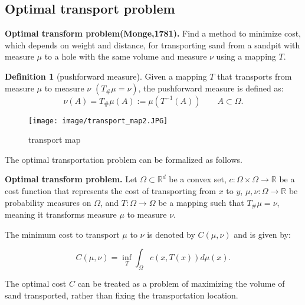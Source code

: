 \documentclass[a4j,10pt, twocolumn, dvipdfmx]{article}
\theoremstyle{definition}
\newtheorem{dfn}{Definition}[section]
\begin{document}
\subsection{Optimal transport problem}
\textbf{Optimal transform problem(Monge,1781).}
Find a method to minimize cost, 
which depends on weight and distance, 
for transporting sand from a sandpit with measure $\mu$ to a hole with the same volume and measure $\nu$ using a mapping $T$.

\begin{dfn}[pushforward measure]
    Given a mapping $T$ that transports from measure $\mu$ to measure $\nu$ $(T_\#\mu = \nu)$, 
    the pushforward measure is defined as:
    \begin{equation*}
        \nu (A) =  T_\#\mu (A) := \mu (T^{-1} (A)) \qquad A \subset \Omega.
    \end{equation*}
\end{dfn}

\begin{figure}[htbp]
    \begin{center}
        \texttt{[image: image/transport\_map2.JPG]}
        \caption{transport map}
    \end{center}
\end{figure}

The optimal transportation problem can be formalized as follows.
\newline

\textbf{Optimal transform problem.}
Let $\Omega \subset \mathbb{R}^d$ be a convex set,
$c: \Omega \times \Omega \to \mathbb{R}$ be a cost function that represents the cost of transporting from $x$ to $y$, 
$\mu, \nu : \Omega \to \mathbb{R}$ be probability measures on $\Omega$, and $T: \Omega \to \Omega$ be a mapping such that $T_\#\mu = \nu$, 
meaning it transforms measure $\mu$ to measure $\nu$.

The minimum cost to transport $\mu$ to $\nu$ is denoted by $C(\mu, \nu)$ and is given by:

\begin{equation*}
    C(\mu, \nu) = \inf_T \int_\Omega c(x, T(x)) d \mu (x).
\end{equation*}

The optimal cost $C$ can be treated as a problem of maximizing the volume of sand transported, 
rather than fixing the transportation location.
\newline
\end{document}
